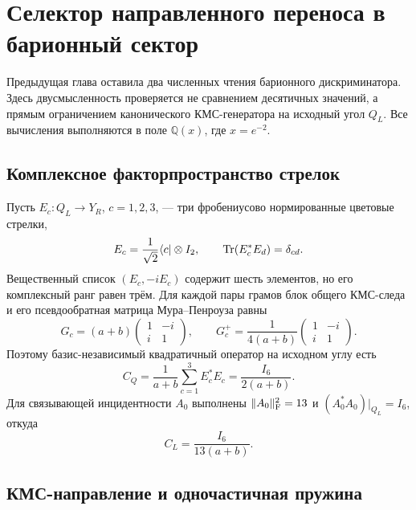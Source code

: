 \chapter{Селектор направленного переноса в барионный сектор}
\label{ch:v8-baryon-directed-transfer-convention-selector-gate}

Предыдущая глава оставила два численных чтения барионного дискриминатора.
Здесь двусмысленность проверяется не сравнением десятичных значений, а
прямым ограничением канонического КМС-генератора на исходный угол $Q_L$.
Все вычисления выполняются в поле $\mathbb Q(x)$, где $x=e^{-2}$.

\section{Комплексное факторпространство стрелок}

Пусть $E_c:Q_L\to Y_R$, $c=1,2,3$, --- три фробениусово
нормированные цветовые стрелки,
\begin{equation}
 E_c=\frac1{\sqrt2}\langle c|\otimes I_2,
 \qquad
 \operatorname{Tr}(E_c^*E_d)=\delta_{cd}.
 \label{eq:v8-baryon-qlyr-normalized-arrows}
\end{equation}
Вещественный список $(E_c,-iE_c)$ содержит шесть элементов, но его
комплексный ранг равен трём. Для каждой пары грамов блок общего КМС-следа
и его псевдообратная матрица Мура--Пенроуза равны
\begin{equation}
 G_c=(a+b)
 \begin{pmatrix}1&-i\\ i&1\end{pmatrix},
 \qquad
 G_c^+=\frac1{4(a+b)}
 \begin{pmatrix}1&-i\\ i&1\end{pmatrix}.
 \label{eq:v8-baryon-qlyr-gram-pseudoinverse}
\end{equation}
Поэтому базис-независимый квадратичный оператор на исходном углу есть
\begin{equation}
 C_Q=\frac1{a+b}\sum_{c=1}^{3}E_c^*E_c
 =\frac{I_6}{2(a+b)}.
 \label{eq:v8-baryon-qlyr-source-casimir}
\end{equation}
Для связывающей инцидентности $A_0$ выполнены
$\|A_0\|_{\rm F}^2=13$ и
$(A_0^*A_0)|_{Q_L}=I_6$, откуда
\begin{equation}
 C_L=\frac{I_6}{13(a+b)}.
 \label{eq:v8-baryon-link-source-casimir}
\end{equation}

\section{КМС-направление и одночастичная пружина}

